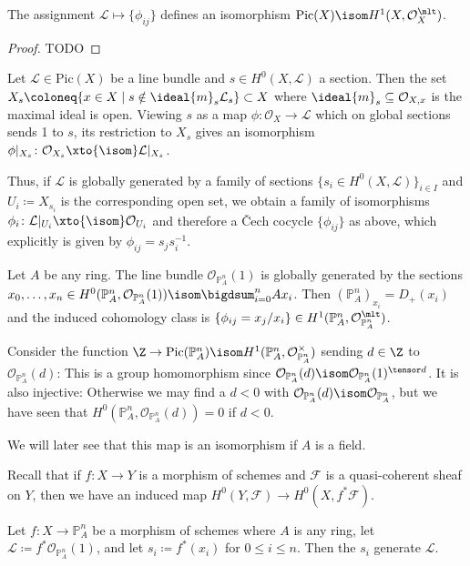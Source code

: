 \documentclass[wip, algebra]{bsteffan-lecturenotes}
\newcommand{\cO}{\mathcal{O}}
\newcommand{\cF}{\mathcal{F}}
\newcommand{\cL}{\mathcal{L}}
\renewcommand{\P}{\mathbb{P}}
\newcommand{\Pic}{\mathrm{Pic}}
\begin{document}
\begin{proposition}
	The assignment $\cL \mapsto \{\phi_{ij}\}$ defines an isomorphism $\Pic(X) \isom H^1(X, \cO_X^\mlt)$.
\end{proposition}
\begin{proof}
	TODO
\end{proof}
\begin{remark}
	Let $\cL \in \Pic(X)$ be a line bundle and $s \in H^0(X, \cL)$ a section.
	Then the set $X_s \coloneq \{x \in X \mid s \notin \ideal{m}_s \cL_s\} \subset X$ where $\ideal{m}_s \subseteq \cO_{X, x}$ is the maximal ideal is open.
	Viewing $s$ as a map $\phi\colon \cO_X \to \cL$ which on global sections sends 1 to $s$, its restriction to $X_s$ gives an isomorphism $\phi|_{X_s}\colon \cO_{X_s} \xto{\isom} \cL|_{X_s}$.

	Thus, if $\cL$ is globally generated by a family of sections $\{s_i \in H^0(X, \cL)\}_{i \in I}$ and $U_i \coloneq X_{s_i}$ is the corresponding open set, we obtain a family of isomorphisms $\phi_i\colon \cL|_{U_i} \xto{\isom} \cO_{U_i}$ and therefore a Čech cocycle $\{\phi_{ij}\}$ as above, which explicitly is given by $\phi_{ij} = s_j s_i^{-1}$.
\end{remark}
\begin{example}
	Let $A$ be any ring.
	The line bundle $\cO_{\P^n_A}(1)$ is globally generated by the sections $x_0, \ldots, x_n \in H^0(\P^n_A, \cO_{\P^n_A}(1)) \isom \bigdsum_{i = 0}^n A x_i$.
	Then $(\P^n_A)_{x_i} = D_+(x_i)$ and the induced cohomology class is $\{\phi_{ij} = x_j / x_i\} \in H^1(\P^n_A, \cO_{\P^n_A}^\mlt)$.
\end{example}
\begin{example}
	Consider the function $\Z \to \Pic(\P^n_A) \isom H^1(\P^n_A, \cO_{\P^n_A}^\times)$ sending $d \in \Z$ to $\cO_{\P^n_A}(d)$:
	This is a group homomorphism since $\cO_{\P^n_A}(d) \isom \cO_{\P^n_A}(1)^{\tensor d}$. 
	It is also injective:
	Otherwise we may find a $d < 0$ with $\cO_{\P^n_A}(d) \isom \cO_{\P^n_A}$, but we have seen that $H^0(\P^n_A, \cO_{\P^n_A}(d)) = 0$ if $d < 0$.
	
	We will later see that this map is an isomorphism if $A$ is a field.
\end{example}
Recall that if $f\colon X \to Y$ is a morphism of schemes and $\cF$ is a quasi-coherent sheaf on $Y$, then we have an induced map $H^0(Y, \cF) \to H^0(X, f^* \cF)$.
\begin{proposition}
	Let $f\colon X \to \P^n_A$ be a morphism of schemes where $A$ is any ring, let $\cL \coloneq f^* \cO_{\P^n_A}(1)$, and let $s_i \coloneq f^*(x_i)$ for $0 \leq i \leq n$.
	Then the $s_i$ generate $\cL$.
\end{proposition}
\end{document}
